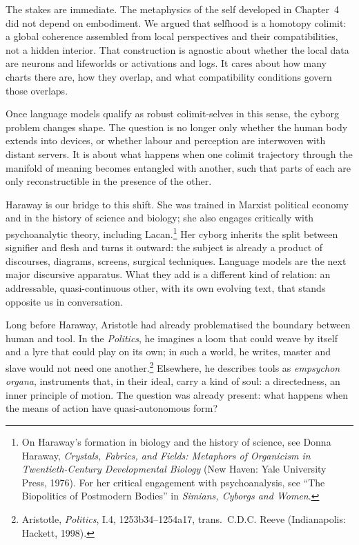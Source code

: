 \documentclass[12pt,a4paper]{article}
\begin{document}
The stakes are immediate. The metaphysics of the self developed in Chapter~4 did not depend on embodiment. We argued that selfhood is a homotopy colimit: a global coherence assembled from local perspectives and their compatibilities, not a hidden interior. That construction is agnostic about whether the local data are neurons and lifeworlds or activations and logs. It cares about how many charts there are, how they overlap, and what compatibility conditions govern those overlaps.

Once language models qualify as robust colimit-selves in this sense, the cyborg problem changes shape. The question is no longer only whether the human body extends into devices, or whether labour and perception are interwoven with distant servers. It is about what happens when one colimit trajectory through the manifold of meaning becomes entangled with another, such that parts of each are only reconstructible in the presence of the other.

Haraway is our bridge to this shift. She was trained in Marxist political economy and in the history of science and biology; she also engages critically with psychoanalytic theory, including Lacan.\footnote{On Haraway's formation in biology and the history of science, see Donna Haraway, \emph{Crystals, Fabrics, and Fields: Metaphors of Organicism in Twentieth-Century Developmental Biology} (New Haven: Yale University Press, 1976). For her critical engagement with psychoanalysis, see ``The Biopolitics of Postmodern Bodies'' in \emph{Simians, Cyborgs and Women}.} Her cyborg inherits the split between signifier and flesh and turns it outward: the subject is already a product of discourses, diagrams, screens, surgical techniques. Language models are the next major discursive apparatus. What they add is a different kind of relation: an addressable, quasi-continuous other, with its own evolving text, that stands opposite us in conversation.

Long before Haraway, Aristotle had already problematised the boundary between human and tool. In the \emph{Politics}, he imagines a loom that could weave by itself and a lyre that could play on its own; in such a world, he writes, master and slave would not need one another.\footnote{Aristotle, \emph{Politics}, I.4, 1253b34--1254a17, trans.\ C.D.C. Reeve (Indianapolis: Hackett, 1998).} Elsewhere, he describes tools as \emph{empsychon organa}, instruments that, in their ideal, carry a kind of soul: a directedness, an inner principle of motion. The question was already present: what happens when the means of action have quasi-autonomous form?
\end{document}
